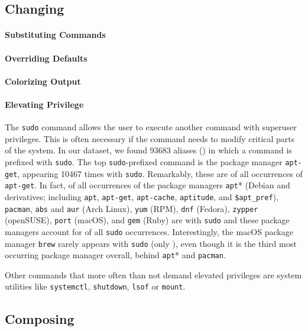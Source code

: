 \subsection{Changing}

\paragraph{\bf Substituting Commands}

\paragraph{\bf Overriding Defaults}

\paragraph{\bf Colorizing Output}

\paragraph{\bf Elevating Privilege}

The \verb|sudo| command allows the user to execute another command with superuser privileges.
This is often necessary if the command needs to modify critical parts of the system.
In our dataset, we found \num{93683} aliases () in which a command is prefixed with \verb|sudo|.
The top \texttt{sudo}-prefixed command is the package manager \verb|apt-get|, appearing \num{10467} times with \verb|sudo|.
Remarkably, these are  of all occurrences of \verb|apt-get|.
In fact,  of all occurrences of the package managers \verb|apt|* (Debian and derivatives; including \verb|apt|, \verb|apt-get|, \verb|apt-cache|, \verb|aptitude|, and \verb|$apt_pref|), \verb|pacman|, \verb|abs| and \verb|aur| (Arch Linux), \verb|yum| (RPM), \verb|dnf| (Fedora), \verb|zypper| (openSUSE), \verb|port| (macOS), and \verb|gem| (Ruby) are with \verb|sudo| and these package managers account for  of all \verb|sudo| occurrences.
Interestingly, the macOS package manager \verb|brew| rarely appears with \verb|sudo| (only ), even though it is the third most occurring package manager overall, behind \verb|apt|* and \verb|pacman|.

Other commands that more often than not demand elevated privileges are system utilities like \verb|systemctl|, \verb|shutdown|, \verb|lsof| or \verb|mount|.

\subsection{Composing}

